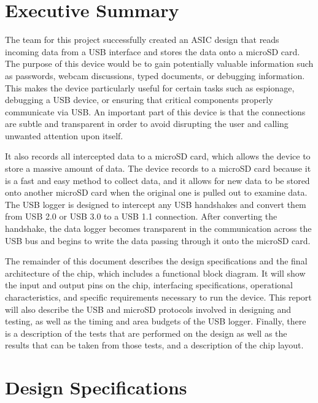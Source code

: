 \documentclass[12pt,letter,oneside]{report}
\begin{document}

\tableofcontents
\chapter{Executive Summary}
The team for this project successfully created an ASIC design that reads incoming data from a USB interface and stores the data onto a microSD card. The purpose of this device would be to gain potentially valuable information such as passwords, webcam discussions, typed documents, or debugging information. This makes the device particularly useful for certain tasks such as espionage, debugging a USB device, or ensuring that critical components properly communicate via USB. An important part of this device is that the connections are subtle and transparent in order to avoid disrupting the user and calling unwanted attention upon itself.

It also records all intercepted data to a microSD card, which allows the device to store a massive amount of data. The device records to a microSD card because it is a fast and easy method to collect data, and it allows for new data to be stored onto another microSD card when the original one is pulled out to examine data. The USB logger is designed to intercept any USB handshakes and convert them from USB 2.0 or USB 3.0 to a USB 1.1 connection. After converting the handshake, the data logger becomes transparent in the communication across the USB bus and begins to write the data passing through it onto the microSD card.

The remainder of this document describes the design specifications and the final architecture of the chip, which includes a functional block diagram. It will show the input and output pins on the chip, interfacing specifications, operational characteristics, and specific requirements necessary to run the device. This report will also describe the USB and microSD protocols involved in designing and testing, as well as the timing and area budgets of the USB logger. Finally, there is a description of the tests that are performed on the design as well as the results that can be taken from those tests, and a description of the chip layout. 
\chapter{Design Specifications}
\end{document}
